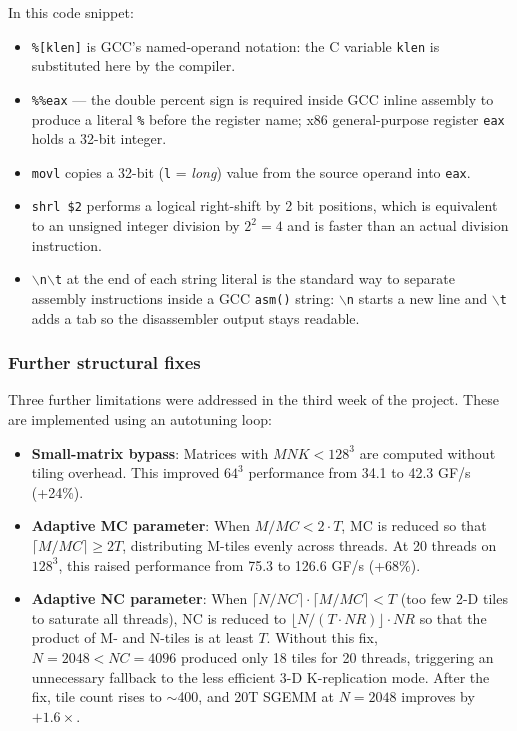 \documentclass[11pt,a4paper]{article}
\begin{document}
\noindent
In this code snippet:
\begin{itemize}
  \item \texttt{\%[klen]} is GCC's named-operand notation: the C variable
        \texttt{klen} is substituted here by the compiler.
  \item \texttt{\%\%eax} — the double percent sign is required inside GCC
        inline assembly to produce a literal \texttt{\%} before the register
        name; x86 general-purpose register \texttt{eax} holds a 32-bit integer.
  \item \texttt{movl} copies a 32-bit (\texttt{l} = \emph{long}) value from the
        source operand into \texttt{eax}.
  \item \texttt{shrl \$2} performs a logical right-shift by 2 bit positions,
        which is equivalent to an unsigned integer division by $2^2 = 4$ and is
        faster than an actual division instruction.
  \item \texttt{$\backslash$n$\backslash$t} at the end of each string literal is
        the standard way to separate assembly instructions inside a GCC
        \texttt{asm()} string: \texttt{$\backslash$n} starts a new line and
        \texttt{$\backslash$t} adds a tab so the disassembler output stays
        readable.
\end{itemize}

\subsubsection{Further structural fixes}

Three further limitations were addressed in the third week of the project. These are implemented using an autotuning loop:

\begin{itemize}
  \item \textbf{Small-matrix bypass}: Matrices with $MNK < 128^3$ are computed without tiling overhead. This improved $64^3$ performance from 34.1 to 42.3 GF/s (+24\%).
  \item \textbf{Adaptive MC parameter}: When $M/MC < 2 \cdot T$, MC is reduced so that $\lceil M/MC \rceil \ge 2T$, distributing M-tiles evenly across threads. At 20 threads on $128^3$, this raised performance from 75.3 to 126.6 GF/s (+68\%).
  \item \textbf{Adaptive NC parameter}: When $\lceil N/NC \rceil \cdot \lceil M/MC \rceil < T$ (too few 2-D tiles to saturate all threads), NC is reduced to $\lfloor N/(T \cdot NR) \rfloor \cdot NR$ so that the product of M- and N-tiles is at least $T$. Without this fix, $N=2048 < NC=4096$ produced only 18 tiles for 20 threads, triggering an unnecessary fallback to the less efficient 3-D K-replication mode. After the fix, tile count rises to $\sim$400, and 20T SGEMM at $N=2048$ improves by $+1.6\times$.
\end{itemize}
\end{document}
